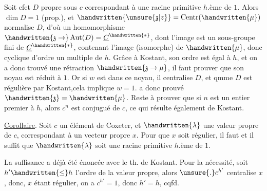Soit  efet $D$  propre sous $c$ correspondant à une racine primitive $h$.ème de $1$. Alors $\dim D=1$ (prop.), et $\handwritten{\unsure{\mathfrak{z}|z}}=\operatorname{Centr}(\handwritten{\mu})$ normalise $D$, d'où un homomorphisme $\handwritten{\mathfrak{z}\to}\operatorname{Aut}(D)=\underline{C}^{\handwritten{*}}$, dont l'image est un sous-groupe fini de $\underline{C}^{\handwritten{*}}$, contenant l'image (isomorphe) de $\handwritten{\mu}$, donc cyclique d'ordre un multiple de $h$. Grâce à Kostant, son ordre est égal à $h$, et on a donc trouvé une rétraction $\handwritten{\mathfrak{z}\to\mu}$, il faut prouver que son noyau est réduit à $1$. Or si $w$ est dans ce noyau, il  centralise $D$, et qmme $D$ est régulière par Kostant,cela implique $w=1$.  a donc prouvé $\handwritten{\mathfrak{z}}=\handwritten{\mu}$. Reste à prouver que si $n$ est un entier premier à $h$, alors $c^n$ est conjugué de $c$, ce qui résulte également de Kostant.

\uline{Corollaire}. Soit $c$ un élément de Coxeter, et $\handwritten{\lambda}$ une valeur propre de $c$, correspondant à un vecteur propre $x$. Pour que $x$ soit régulier, il faut et il suffit que $\handwritten{\lambda}$ soit une racine primitive $h$.ème de $1$.
\reversemarginpar{}\normalmarginpar

La suffisance a déjà été énoncée avec le th. de Kostant. Pour la nécessité, soit $h'\handwritten{\leq}h$ l'ordre de la valeur propre, alors $\unsure{\mathbin{.}}c^{h'}$ centralise $x$, donc, $x$ étant régulier, on a $c^{h'}=1$, donc $h'=h$, cqfd.

